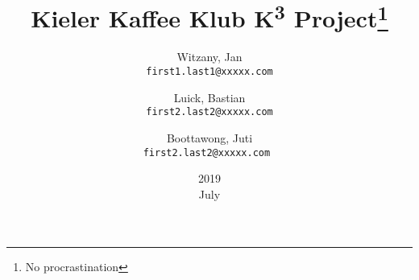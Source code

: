 \documentclass{article}
\title{Kieler Kaffee Klub K\textsuperscript{3} Project\thanks{No procrastination}}
\date{2019\\ July}
\author{
  Witzany, Jan\\
  \texttt{first1.last1@xxxxx.com}
  \and
  Luick, Bastian\\
  \texttt{first2.last2@xxxxx.com}
  \and
  Boottawong, Juti\\
  \texttt{first2.last2@xxxxx.com	}
}
\begin{document}
\begin{titlepage}
\maketitle

\end{titlepage}
\tableofcontents						%

\vspace{2cm} %
 
























  
\end{document}
